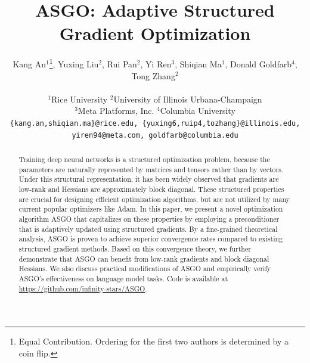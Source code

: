 \documentclass{article}
\title{ASGO: Adaptive Structured Gradient Optimization}
\author{
{Kang An$^{1}$\thanks{Equal Contribution. Ordering for the first two authors is determined by a coin flip.},
Yuxing Liu$^{2}$\footnotemark[1],
Rui Pan$^{2}$, Yi Ren$^{3}$,
Shiqian Ma$^{1}$,
Donald Goldfarb$^{4}$,
Tong Zhang$^{2}$}
\\ \\
{\normalsize $^{1}$Rice University 
$^{2}$University of Illinois Urbana-Champaign} \\ {\normalsize
$^{3}$Meta Platforms, Inc.
$^{4}$Columbia University} \\
\tiny\texttt{\{kang.an,shiqian.ma\}@rice.edu, \{yuxing6,ruip4,tozhang\}@illinois.edu, yiren94@meta.com, goldfarb@columbia.edu}
}
\date{}
\theoremstyle{remark}
\begin{document}
\maketitle

\begin{abstract}
    Training deep neural networks is a structured optimization problem, because the parameters are naturally represented by matrices and tensors rather than by vectors. Under this structural representation, it has been widely observed that gradients are low-rank and Hessians are approximately block diagonal. These structured properties are crucial for designing efficient optimization algorithms, but are not utilized by many current popular optimizers like Adam. In this paper, we present a novel optimization algorithm ASGO that capitalizes on these properties by employing a preconditioner that is adaptively updated using structured gradients. By
    a fine-grained theoretical analysis, ASGO is proven to achieve superior convergence rates compared to existing structured gradient methods. Based on this convergence theory, we further demonstrate that ASGO can benefit from low-rank gradients and block diagonal Hessians. We also discuss practical modifications of ASGO and empirically verify ASGO's effectiveness on language model tasks.
    Code is available at \url{https://github.com/infinity-stars/ASGO}.
\end{abstract}
\end{document}

